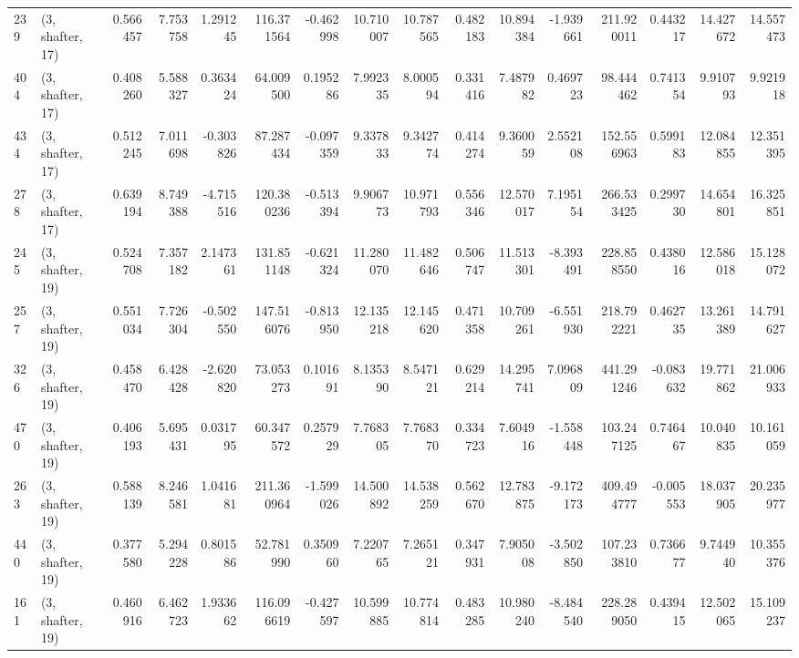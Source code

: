 \begin{tabular}{llrrrrrrrrrrrrrr}
239 &  (3, shafter, 17) &   0.566457 &   7.753758 &   1.291245 &   116.371564 &  -0.462998 &  10.710007 &  10.787565 &  0.482183 &  10.894384 &  -1.939661 &    211.920011 &    0.443217 &   14.427672 &   14.557473 \\
404 &  (3, shafter, 17) &   0.408260 &   5.588327 &   0.363424 &    64.009500 &   0.195286 &   7.992335 &   8.000594 &  0.331416 &   7.487982 &   0.469723 &     98.444462 &    0.741354 &    9.910793 &    9.921918 \\
434 &  (3, shafter, 17) &   0.512245 &   7.011698 &  -0.303826 &    87.287434 &  -0.097359 &   9.337833 &   9.342774 &  0.414274 &   9.360059 &   2.552108 &    152.556963 &    0.599183 &   12.084855 &   12.351395 \\
278 &  (3, shafter, 17) &   0.639194 &   8.749388 &  -4.715516 &   120.380236 &  -0.513394 &   9.906773 &  10.971793 &  0.556346 &  12.570017 &   7.195154 &    266.533425 &    0.299730 &   14.654801 &   16.325851 \\
245 &  (3, shafter, 19) &   0.524708 &   7.357182 &   2.147361 &   131.851148 &  -0.621324 &  11.280070 &  11.482646 &  0.506747 &  11.513301 &  -8.393491 &    228.858550 &    0.438016 &   12.586018 &   15.128072 \\
257 &  (3, shafter, 19) &   0.551034 &   7.726304 &  -0.502550 &   147.516076 &  -0.813950 &  12.135218 &  12.145620 &  0.471358 &  10.709261 &  -6.551930 &    218.792221 &    0.462735 &   13.261389 &   14.791627 \\
326 &  (3, shafter, 19) &   0.458470 &   6.428428 &  -2.620820 &    73.053273 &   0.101691 &   8.135390 &   8.547121 &  0.629214 &  14.295741 &   7.096809 &    441.291246 &   -0.083632 &   19.771862 &   21.006933 \\
470 &  (3, shafter, 19) &   0.406193 &   5.695431 &   0.031795 &    60.347572 &   0.257929 &   7.768305 &   7.768370 &  0.334723 &   7.604916 &  -1.558448 &    103.247125 &    0.746467 &   10.040835 &   10.161059 \\
263 &  (3, shafter, 19) &   0.588139 &   8.246581 &   1.041681 &   211.360964 &  -1.599026 &  14.500892 &  14.538259 &  0.562670 &  12.783875 &  -9.172173 &    409.494777 &   -0.005553 &   18.037905 &   20.235977 \\
440 &  (3, shafter, 19) &   0.377580 &   5.294228 &   0.801586 &    52.781990 &   0.350960 &   7.220765 &   7.265121 &  0.347931 &   7.905008 &  -3.502850 &    107.233810 &    0.736677 &    9.744940 &   10.355376 \\
161 &  (3, shafter, 19) &   0.460916 &   6.462723 &   1.933662 &   116.096619 &  -0.427597 &  10.599885 &  10.774814 &  0.483285 &  10.980240 &  -8.484540 &    228.289050 &    0.439415 &   12.502065 &   15.109237 \\

\end{tabular}
